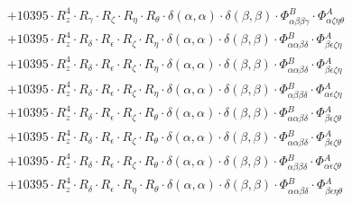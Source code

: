 \documentclass{article}
\begin{document}
\begin{subequations}
\begin{gather}
\begin{array}{c}
 \\[0.2em] 		 + 10395 \cdot R_{z}^{4} \cdot R_{\gamma{}} \cdot R_{\zeta{}} \cdot R_{\eta{}} \cdot R_{\theta{}} \cdot \delta{}\left(\alpha{}, \alpha{}\right) \cdot \delta{}\left(\beta{}, \beta{}\right) \cdot \Phi{}^{B}_{\alpha{}\beta{}\beta{}\gamma{}} \cdot \Phi{}^{A}_{\alpha{}\zeta{}\eta{}\theta{}} 
 \\[0.2em] 		 + 10395 \cdot R_{z}^{4} \cdot R_{\delta{}} \cdot R_{\epsilon{}} \cdot R_{\zeta{}} \cdot R_{\eta{}} \cdot \delta{}\left(\alpha{}, \alpha{}\right) \cdot \delta{}\left(\beta{}, \beta{}\right) \cdot \Phi{}^{B}_{\alpha{}\alpha{}\beta{}\delta{}} \cdot \Phi{}^{A}_{\beta{}\epsilon{}\zeta{}\eta{}} 
 \\[0.2em] 		 + 10395 \cdot R_{z}^{4} \cdot R_{\delta{}} \cdot R_{\epsilon{}} \cdot R_{\zeta{}} \cdot R_{\eta{}} \cdot \delta{}\left(\alpha{}, \alpha{}\right) \cdot \delta{}\left(\beta{}, \beta{}\right) \cdot \Phi{}^{B}_{\alpha{}\alpha{}\beta{}\delta{}} \cdot \Phi{}^{A}_{\beta{}\epsilon{}\zeta{}\eta{}} 
 \\[0.2em] 		 + 10395 \cdot R_{z}^{4} \cdot R_{\delta{}} \cdot R_{\epsilon{}} \cdot R_{\zeta{}} \cdot R_{\eta{}} \cdot \delta{}\left(\alpha{}, \alpha{}\right) \cdot \delta{}\left(\beta{}, \beta{}\right) \cdot \Phi{}^{B}_{\alpha{}\beta{}\beta{}\delta{}} \cdot \Phi{}^{A}_{\alpha{}\epsilon{}\zeta{}\eta{}} 
 \\[0.2em] 		 + 10395 \cdot R_{z}^{4} \cdot R_{\delta{}} \cdot R_{\epsilon{}} \cdot R_{\zeta{}} \cdot R_{\theta{}} \cdot \delta{}\left(\alpha{}, \alpha{}\right) \cdot \delta{}\left(\beta{}, \beta{}\right) \cdot \Phi{}^{B}_{\alpha{}\alpha{}\beta{}\delta{}} \cdot \Phi{}^{A}_{\beta{}\epsilon{}\zeta{}\theta{}} 
 \\[0.2em] 		 + 10395 \cdot R_{z}^{4} \cdot R_{\delta{}} \cdot R_{\epsilon{}} \cdot R_{\zeta{}} \cdot R_{\theta{}} \cdot \delta{}\left(\alpha{}, \alpha{}\right) \cdot \delta{}\left(\beta{}, \beta{}\right) \cdot \Phi{}^{B}_{\alpha{}\alpha{}\beta{}\delta{}} \cdot \Phi{}^{A}_{\beta{}\epsilon{}\zeta{}\theta{}} 
 \\[0.2em] 		 + 10395 \cdot R_{z}^{4} \cdot R_{\delta{}} \cdot R_{\epsilon{}} \cdot R_{\zeta{}} \cdot R_{\theta{}} \cdot \delta{}\left(\alpha{}, \alpha{}\right) \cdot \delta{}\left(\beta{}, \beta{}\right) \cdot \Phi{}^{B}_{\alpha{}\beta{}\beta{}\delta{}} \cdot \Phi{}^{A}_{\alpha{}\epsilon{}\zeta{}\theta{}} 
 \\[0.2em] 		 + 10395 \cdot R_{z}^{4} \cdot R_{\delta{}} \cdot R_{\epsilon{}} \cdot R_{\eta{}} \cdot R_{\theta{}} \cdot \delta{}\left(\alpha{}, \alpha{}\right) \cdot \delta{}\left(\beta{}, \beta{}\right) \cdot \Phi{}^{B}_{\alpha{}\alpha{}\beta{}\delta{}} \cdot \Phi{}^{A}_{\beta{}\epsilon{}\eta{}\theta{}} 

\end{array}
\end{gather}
\end{subequations}
\end{document}
